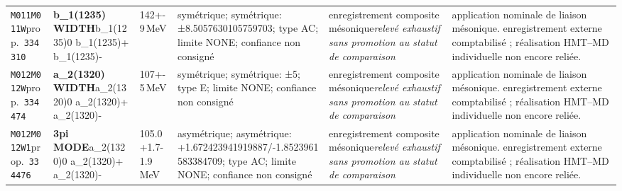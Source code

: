 \begin{landscape}
\begin{longtable}{L{1.85cm}L{4.45cm}L{2.35cm}L{4.05cm}L{3.35cm}L{7.15cm}}
\texttt{M011}\newline \texttt{M011W}\newline prop.\ \texttt{334310} & \textbf{b\_\allowbreak{}1(1235) WIDTH}\newline b\_\allowbreak{}1(1235)0 \textbar{}\allowbreak{} b\_\allowbreak{}1(1235)+ \textbar{}\allowbreak{} b\_\allowbreak{}1(1235)- & 142+-9\,MeV & symétrique; symétrique: ±8.5057630105759703; type AC; limite NONE; confiance non consigné & enregistrement composite mésonique\newline \emph{relevé exhaustif sans promotion au statut de comparaison} & application nominale de liaison mésonique. enregistrement externe comptabilisé ; réalisation HMT--MD individuelle non encore reliée. \\
\texttt{M012}\newline \texttt{M012W}\newline prop.\ \texttt{334474} & \textbf{a\_\allowbreak{}2(1320) WIDTH}\newline a\_\allowbreak{}2(1320)0 \textbar{}\allowbreak{} a\_\allowbreak{}2(1320)+ \textbar{}\allowbreak{} a\_\allowbreak{}2(1320)- & 107+-5\,MeV & symétrique; symétrique: ±5; type E; limite NONE; confiance non consigné & enregistrement composite mésonique\newline \emph{relevé exhaustif sans promotion au statut de comparaison} & application nominale de liaison mésonique. enregistrement externe comptabilisé ; réalisation HMT--MD individuelle non encore reliée. \\
\texttt{M012}\newline \texttt{M012W1}\newline prop.\ \texttt{334476} & \textbf{3pi MODE}\newline a\_\allowbreak{}2(1320)0 \textbar{}\allowbreak{} a\_\allowbreak{}2(1320)+ \textbar{}\allowbreak{} a\_\allowbreak{}2(1320)- & 105.0+1.7-1.9\,MeV & asymétrique; asymétrique: +1.672423941919887/-1.8523961583384709; type AC; limite NONE; confiance non consigné & enregistrement composite mésonique\newline \emph{relevé exhaustif sans promotion au statut de comparaison} & application nominale de liaison mésonique. enregistrement externe comptabilisé ; réalisation HMT--MD individuelle non encore reliée. \\

\end{longtable}
\end{landscape}
